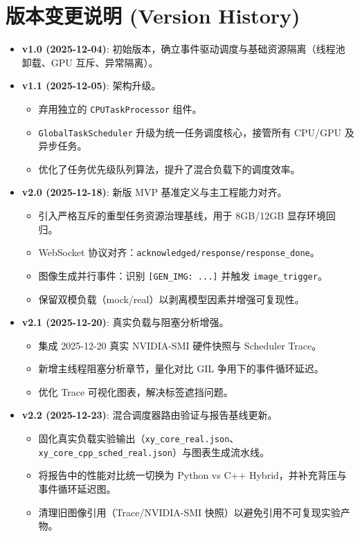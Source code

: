 \documentclass[a4paper,12pt]{article}
\begin{document}
\section{版本变更说明 (Version History)}

\begin{itemize}
    \item \textbf{v1.0 (2025-12-04)}: 初始版本，确立事件驱动调度与基础资源隔离（线程池卸载、GPU 互斥、异常隔离）。
    \item \textbf{v1.1 (2025-12-05)}: 架构升级。
    \begin{itemize}
        \item 弃用独立的 \texttt{CPUTaskProcessor} 组件。
        \item \texttt{GlobalTaskScheduler} 升级为统一任务调度核心，接管所有 CPU/GPU 及异步任务。
        \item 优化了任务优先级队列算法，提升了混合负载下的调度效率。
    \end{itemize}
    \item \textbf{v2.0 (2025-12-18)}: 新版 MVP 基准定义与主工程能力对齐。
    \begin{itemize}
        \item 引入严格互斥的重型任务资源治理基线，用于 8GB/12GB 显存环境回归。
        \item WebSocket 协议对齐：\texttt{acknowledged/response/response\_done}。
        \item 图像生成并行事件：识别 \texttt{[GEN\_IMG: ...]} 并触发 \texttt{image\_trigger}。
        \item 保留双模负载（mock/real）以剥离模型因素并增强可复现性。
    \end{itemize}
    \item \textbf{v2.1 (2025-12-20)}: 真实负载与阻塞分析增强。
    \begin{itemize}
        \item 集成 2025-12-20 真实 NVIDIA-SMI 硬件快照与 Scheduler Trace。
        \item 新增主线程阻塞分析章节，量化对比 GIL 争用下的事件循环延迟。
        \item 优化 Trace 可视化图表，解决标签遮挡问题。
    \end{itemize}
    \item \textbf{v2.2 (2025-12-23)}: 混合调度器路由验证与报告基线更新。
    \begin{itemize}
        \item 固化真实负载实验输出（\texttt{xy\_core\_real.json}、\texttt{xy\_core\_cpp\_sched\_real.json}）与图表生成流水线。
        \item 将报告中的性能对比统一切换为 Python vs C++ Hybrid，并补充背压与事件循环延迟图。
        \item 清理旧图像引用（Trace/NVIDIA-SMI 快照）以避免引用不可复现实验产物。
    \end{itemize}
\end{itemize}
\end{document}
